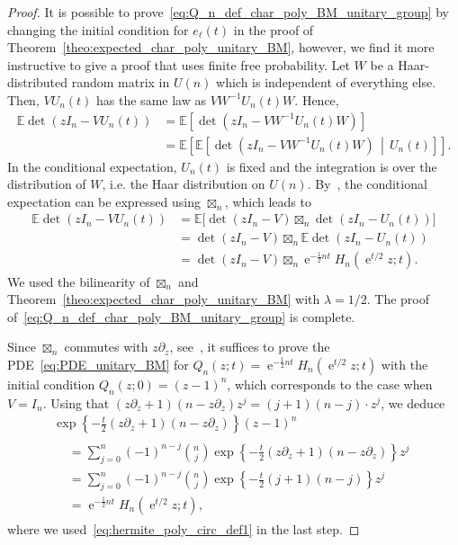\documentclass[AHL,Unicode,longabstracts,published]{cedram}
\DeclareMathOperator{\eee}{e}
\newcommand{\E}{\mathbb{E}}
\begin{document}
\begin{proof}
It is possible to prove~\eqref{eq:Q_n_def_char_poly_BM_unitary_group} by changing the initial condition for $e_\ell(t)$ in the proof of Theorem~\ref{theo:expected_char_poly_unitary_BM}, however, we find it more instructive to give a proof that uses finite free probability. Let $W$ be a Haar-distributed random matrix in $U(n)$ which is independent of everything else. Then, $V U_n(t)$ has the same law as $V W^{-1} U_n(t) W$. Hence,
\begin{align*}
\E \det(z I_n - V U_n(t)) &=
\E \left[\det\left(z I_n - V W^{-1} U_n(t) W\right)\right]\\
&=
\E \left[\E \left[\det\left(z I_n - V W^{-1} U_n(t) W\right) \,\middle|\, U_n(t)\right]\right].
\end{align*}
In the conditional expectation, $U_n(t)$ is fixed and the integration is over the distribution of $W$, i.e. the Haar distribution on $U(n)$. By~\cite[Theorem~1.5]{marcus_spielman_srivastava}, the conditional expectation can be expressed using $\boxtimes_n$, which leads to
\begin{align*}
\E \det(z I_n - V U_n(t)) &=
\E \big[\det (z I_n-V) \boxtimes_n \det (z I_n-U_n(t))\big]\\
&=
\det (zI_n-V) \boxtimes_n \E \det (z I_n-U_n(t))\\
&=
\det (z I_n-V) \boxtimes_n \eee^{-\frac 12 n t} H_n\left(\eee^{t/2}z; t\right).
\end{align*}
We used the bilinearity of $\boxtimes_n$ and Theorem~\ref{theo:expected_char_poly_unitary_BM} with $\lambda = 1/2$. The proof of~\eqref{eq:Q_n_def_char_poly_BM_unitary_group} is complete.

Since $\boxtimes_n$ commutes with $z\partial_z$, see~\cite[p.~810]{marcus_spielman_srivastava}, it suffices to prove the PDE~\eqref{eq:PDE_unitary_BM} for $Q_n(z; t) = \eee^{-\frac 12 n t} H_n(\eee^{t/2}z; t)$ with the initial condition $Q_n(z;0) = (z-1)^n$, which corresponds to the case when $V= I_n$. Using that $(z \partial_z +1) (n- z\partial_z) z^j = {(j+1)(n-j)} \cdot z^j$, we deduce
\pagebreak
\begin{multline*}
\exp\left\{-\frac t2 (z \partial_z+1) (n- z\partial_z)\right\} (z-1)^n \\
\begin{aligned}
&=
\sum_{j=0}^n (-1)^{n-j} \binom nj \exp\left\{-\frac t2 (z \partial_z+1) (n- z\partial_z)\right\} z^j
\\
&=
\sum_{j=0}^n (-1)^{n-j} \binom nj \exp\left\{ - \frac {t}{2} (j+1) (n-j)\right\} z^j \\
&= \eee^{-\frac 12 n t} H_n\left(\eee^{t/2}z; t\right),
\end{aligned}
\end{multline*}
where we used~\eqref{eq:hermite_poly_circ_def1} in the last step.
\end{proof}
\end{document}
